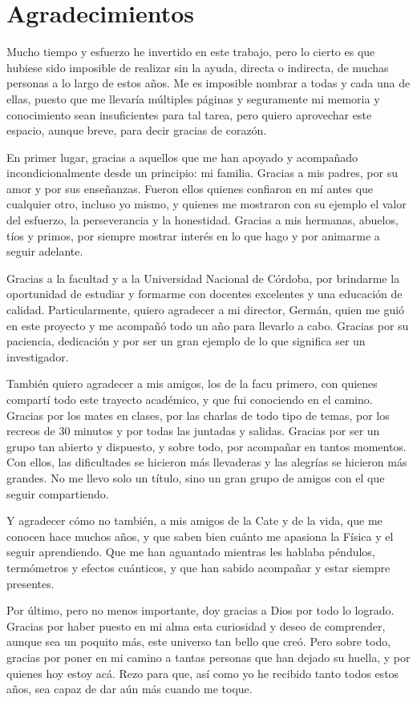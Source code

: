 \chapter*{Agradecimientos}
\thispagestyle{empty}

Mucho tiempo y esfuerzo he invertido en este trabajo, pero lo cierto es que hubiese
sido imposible de realizar sin la ayuda, directa o indirecta, de muchas personas a lo largo
de estos años. Me es imposible nombrar a todas y cada una de ellas, puesto que me
llevaría múltiples páginas y seguramente mi memoria y conocimiento sean insuficientes
para tal tarea, pero quiero aprovechar este espacio, aunque breve, para decir gracias
de corazón.

En primer lugar, gracias a aquellos que me han apoyado y acompañado incondicionalmente
desde un principio: mi familia. Gracias a mis padres, por su amor y por sus enseñanzas.
Fueron ellos quienes confiaron en mí antes que cualquier otro, incluso yo mismo, y quienes
me mostraron con su ejemplo el valor del esfuerzo, la perseverancia y la honestidad. Gracias
a mis hermanas, abuelos, tíos y primos, por siempre mostrar interés en lo que hago y por
animarme a seguir adelante.

Gracias a la facultad y a la Universidad Nacional de Córdoba, por brindarme la oportunidad
de estudiar y formarme con docentes excelentes y una educación de calidad. Particularmente,
quiero agradecer a mi director, Germán, quien me guió en este proyecto y me acompañó todo un
año para llevarlo a cabo. Gracias por su paciencia, dedicación y por ser un gran ejemplo
de lo que significa ser un investigador.

También quiero agradecer a mis amigos, los de la facu primero, con quienes compartí todo
este trayecto académico, y que fui conociendo en el camino. Gracias por los mates en clases,
por las charlas de todo tipo de temas, por los recreos de 30 minutos y por todas las juntadas
y salidas. Gracias por ser un grupo tan abierto y dispuesto, y sobre todo, por acompañar en
tantos momentos. Con ellos, las dificultades se hicieron más llevaderas y las alegrías se
hicieron más grandes. No me llevo solo un título, sino un gran grupo de amigos con el que
seguir compartiendo.

Y agradecer cómo no también, a mis amigos de la Cate y de la vida, que me conocen hace
muchos años, y que saben bien cuánto me apasiona la Física y el seguir aprendiendo. Que
me han aguantado mientras les hablaba péndulos, termómetros y efectos cuánticos, y que
han sabido acompañar y estar siempre presentes.

Por último, pero no menos importante, doy gracias a Dios por todo lo logrado. Gracias
por haber puesto en mi alma esta curiosidad y deseo de comprender, aunque sea un poquito
más, este universo tan bello que creó. Pero sobre todo, gracias por poner en mi camino
a tantas personas que han dejado su huella, y por quienes hoy estoy acá. Rezo para que,
así como yo he recibido tanto todos estos años, sea capaz de dar aún más cuando me toque.